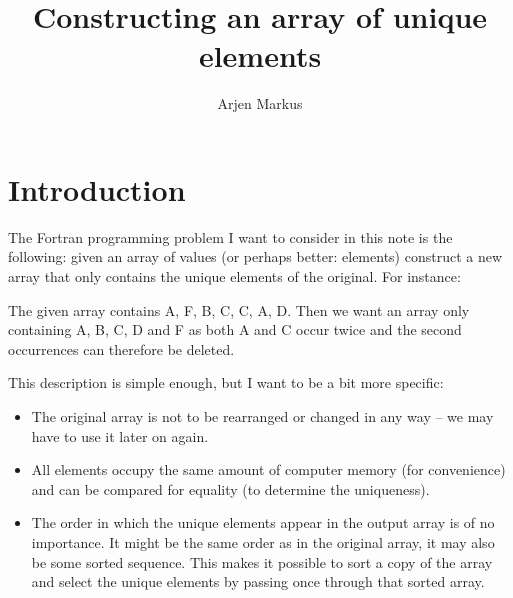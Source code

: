 \documentclass[onecolumn]{article}
\begin{document}
\title{Constructing an array of unique elements}

\author{Arjen Markus}

\maketitle

\section*{Introduction}
The Fortran programming problem I want to consider in this note is the following: given an array of values (or perhaps better: elements)
construct a new array that only contains the unique elements of the original. For instance:

\noindent The given array contains A, F, B, C, C, A, D. Then we want an array only containing A, B, C, D and F as both A and C occur
twice and the second occurrences can therefore be deleted.

This description is simple enough, but I want to be a bit more specific:
\begin{itemize}
\item
The original array is not to be rearranged or changed in any way -- we may have to use it later on again.
\item
All elements occupy the same amount of computer memory (for convenience) and can be compared for equality (to determine the uniqueness).
\item
The order in which the unique elements appear in the output array is of no importance. It might be the same order as
in the original array, it may also be some sorted sequence. This makes it possible to sort a copy of the array and
select the unique elements by passing once through that sorted array.
\end{itemize}
\end{document}
